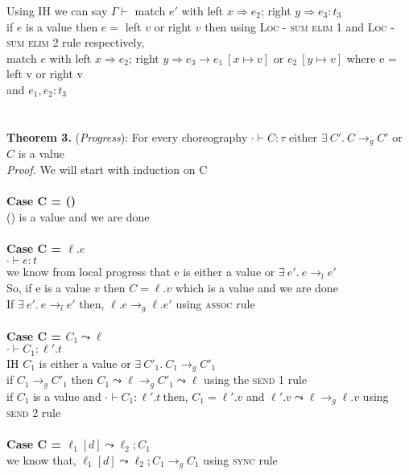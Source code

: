 \documentclass{article}
\begin{document}
Using IH we can say $\Gamma \vdash$ match $e'$ with left $x \Rightarrow e_2 $; right $ y \Rightarrow e_3 : t_3$ \\
if $e$ is a value then $e =$ left $v$ or right $v$ then using \textsc{Loc - sum elim 1} and \textsc{Loc - sum elim 2} rule respectively, \\
match $e$ with left $x \Rightarrow e_2 $; right $ y \Rightarrow e_3 \to  e_1\ [x \mapsto v] $ or $  e_2\ [y \mapsto v]$ where e = left v or right v\\
and $e_1, e_2 : t_3$
\\\\
\\
\textbf{Theorem 3.} (\textit{Progress}): For every choreography $\cdot \vdash C : \tau$ either $  \exists \ C'.\ C \to_g C'$  or $C$ is a value
  \\
\textit{Proof.} We will start with induction on C \\\\
\textbf{Case C = ()} \\
() is a value and we are done \\ \\
\textbf{Case C = $\ell.e$} \\
$\cdot \vdash e: t$\\
we know from local progress that e is either a value or $ \exists \ e'.\ e \to_l e'$  \\
So, if e is a value $v$ then $C = \ell.v$ which is a value and we are done \\
If $ \exists \ e'.\ e \to_l e'$ then, $ \ell. e \to_g \ell.e'$ using \textsc{assoc} rule
\\ \\
\textbf{Case C = $C_1 \leadsto \ell$} \\
$\cdot \vdash C_1: \ell'.t$\\
IH $C_1$ is either a value or $  \exists \ C'_1.\ C_1 \to_g C'_1 $ \\
if $C_1 \to_g C'_1$ then $C_1 \leadsto \ell \to_g C'_1 \leadsto \ell$ using the \textsc{send 1} rule \\
if $C_1$ is a value and $\cdot \vdash C_1: \ell'.t \ $then, $C_1 = \ell'.v$ and $\ell'.v \leadsto \ell \to_g \ell.v$ using \textsc{send 2} rule 
\\
\\
\textbf{Case C = $\ell_1[d] \leadsto \ell_2; C_1$} \\ 
 we know that, $\ell_1[d] \leadsto \ell_2; C_1 \to_g C_1$ using \textsc{sync} rule \\
\\
\end{document}
